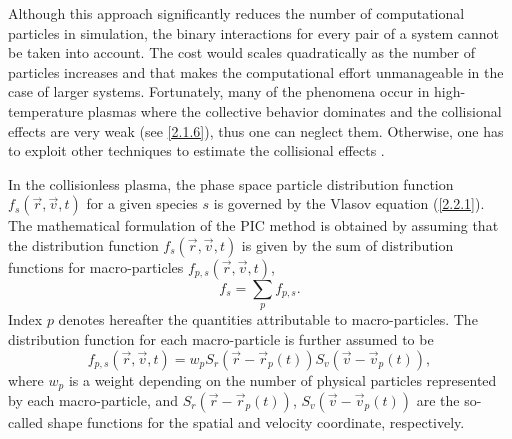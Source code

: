 Although this approach significantly reduces the number of computational particles in simulation, the binary interactions for every pair of a system cannot be taken into account. The cost would scales quadratically as the number of particles increases and that makes the computational effort unmanageable in the case of larger systems. Fortunately, many of the phenomena occur in high-temperature plasmas where the collective behavior dominates and the collisional effects are very weak (see \ref{2.1.6}), thus one can neglect them. Otherwise, one has to exploit other techniques to estimate the collisional effects \cite{lapenta}.

In the collisionless plasma, the phase space particle distribution function  $ f_{s} \left(\vec{r}, \vec{v}, t\right) $ for a given species $ s $ is governed by the Vlasov equation (\ref{2.2.1}). The mathematical formulation of the PIC method is obtained by assuming that the distribution function $ f_{s} \left(\vec{r}, \vec{v}, t\right) $ is given by the sum of distribution functions for macro-particles $ f_{p, s} \left(\vec{r}, \vec{v}, t\right) $,
\begin{equation}
\label{3.1.1}
f_{s} =  \sum_{p} f_{p, s}.
\end{equation}
Index $ p $ denotes hereafter the quantities attributable to macro-particles. The distribution function for each macro-particle is further assumed to be
\begin{equation}
\label{3.1.2}
f_{p, s}\left(\vec{r}, \vec{v}, t \right) = w_{p} S_{r}\left(\vec{r} - \vec{r}_{p}\left(t\right) \right)  S_{v}\left(\vec{v} - \vec{v}_{p}\left( t\right) \right),
\end{equation}
where $ w_{p} $ is a weight depending on the number of physical particles represented by each macro-particle, and $ S_{r}\left(\vec{r} - \vec{r}_{p}\left(t\right) \right) $, $ S_{v}\left(\vec{v} - \vec{v}_{p}\left(t\right) \right) $ are the so-called shape functions for the spatial and velocity coordinate, respectively.

